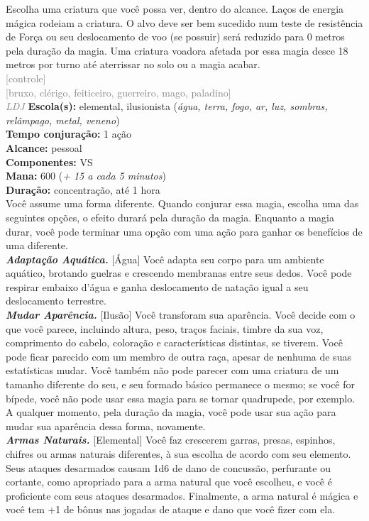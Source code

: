 \documentclass{RPG_Adventure}[2021/10/20]
\begin{document}
{\normalsize Escolha uma criatura que você possa ver, dentro do alcance. Laços de energia mágica rodeiam a criatura. O alvo deve ser bem sucedido num teste de resistência de Força ou seu deslocamento de voo (se possuir) será reduzido para 0 metros pela duração da magia. Uma criatura voadora afetada por essa magia desce 18 metros por turno até aterrissar no solo ou a magia acabar.\\}
{\scriptsize \textcolor{gray}{[controle]\\}}
{\scriptsize \textcolor{gray}{[bruxo, clérigo, feiticeiro, guerreiro, mago, paladino]\\}}
{\tiny \textcolor{gray}{\textit{LDJ}}}\jump{}
{\small \t \textbf{Escola(s):} elemental, ilusionista (\textit{água, terra, fogo, ar, luz, sombras, relâmpago, metal, veneno})\\\t \textbf{Tempo conjuração:} 1 ação\\\t \textbf{Alcance:} pessoal\\\t \textbf{Componentes:} VS\\\t \textbf{Mana:} 600 (\textit{+ 15 a cada 5 minutos})\\\t \textbf{Duração:} concentração, até 1 hora\\}
{\normalsize Você assume uma forma diferente. Quando conjurar essa magia, escolha uma das seguintes opções, o efeito durará pela duração da magia. Enquanto a magia durar, você pode terminar uma opção com uma ação para ganhar os benefícios de uma diferente.\\\t \textbf{\textit{Adaptação Aquática.}} [Água] Você adapta seu corpo para um ambiente aquático, brotando guelras e crescendo membranas entre seus dedos. Você pode respirar embaixo d’água e ganha deslocamento de natação igual a seu deslocamento terrestre.\\\t \textbf{\textit{Mudar Aparência.}} [Ilusão] Você transforam sua aparência. Você decide com o que você parece, incluindo altura, peso, traços faciais, timbre da sua voz, comprimento do cabelo, coloração e características distintas, se tiverem. Você pode ficar parecido com um membro de outra raça, apesar de nenhuma de suas estatísticas mudar. Você também não pode parecer com uma criatura de um tamanho diferente do seu, e seu formado básico permanece o mesmo; se você for bípede, você não pode usar essa magia para se tornar quadrupede, por exemplo. A qualquer momento, pela duração da magia, você pode usar sua ação para mudar sua aparência dessa forma, novamente.\\\t \textbf{\textit{Armas Naturais.}} [Elemental] Você faz crescerem garras, presas, espinhos, chifres ou armas naturais diferentes, à sua escolha de acordo com seu elemento. Seus ataques desarmados causam 1d6 de dano de concussão, perfurante ou cortante, como apropriado para a arma natural que você escolheu, e você é proficiente com seus ataques desarmados. Finalmente, a arma natural é mágica e você tem +1 de bônus nas jogadas de ataque e dano que você fizer com ela.\\}
\end{document}
